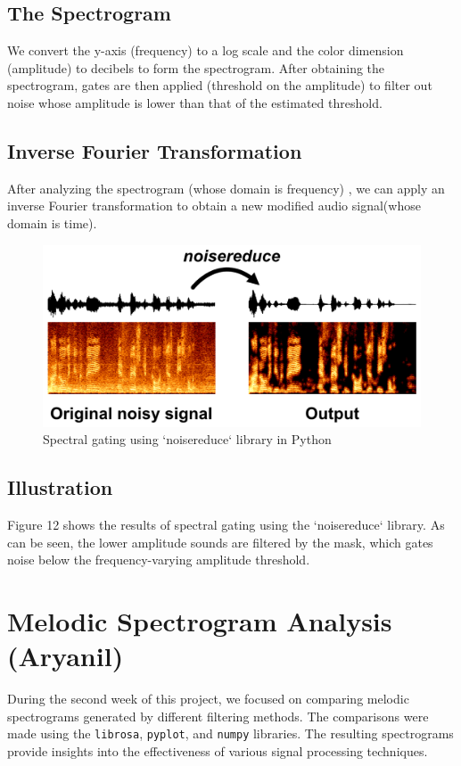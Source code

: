 \documentclass[conference]{IEEEtran}
\begin{document}
\subsection{The Spectrogram}
We convert the y-axis (frequency) to a log scale and
the color dimension (amplitude) to decibels to form the
spectrogram. After obtaining the spectrogram, gates are then
applied (threshold on the amplitude) to filter out noise whose
amplitude is lower than that of the estimated threshold.

\subsection{Inverse Fourier Transformation}
After analyzing the spectrogram (whose domain is frequency) , we can apply an inverse Fourier transformation to
obtain a new modified audio signal(whose domain is time).

\begin{figure}[h]
    \centering
    \includegraphics[width=0.8\linewidth]{Images/noisereduce.png}
    \caption{Spectral gating using `noisereduce` library in Python}
    \label{fig:spectral-gating}
\end{figure}

\subsection{Illustration}
Figure 12 shows the results of spectral gating using the `noisereduce` library.
As can be seen, the lower amplitude
sounds are filtered by the mask, which gates noise below the
frequency-varying amplitude threshold.




\section{Melodic Spectrogram Analysis (Aryanil)}
During the second week of this project, we focused on comparing melodic spectrograms generated by different filtering methods. The comparisons were made using the \texttt{librosa}, \texttt{pyplot}, and \texttt{numpy} libraries. The resulting spectrograms provide insights into the effectiveness of various signal processing techniques.
\end{document}
